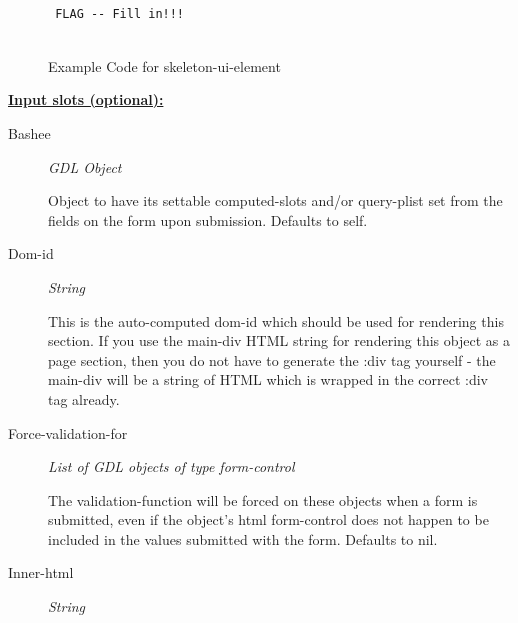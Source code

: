 \documentclass [11pt]{book}
\begin{document}
\begin{itemize}
\begin{figure}
\begin{lrbox}{\boxedverb}
\begin{minipage}{\linewidth}
{\small

\begin{verbatim}

 FLAG -- Fill in!!!


\end{verbatim}}
\end{minipage}
\end{lrbox}
\fbox{\usebox{\boxedverb}}

\caption{Example Code for skeleton-ui-element}

\label{fig:example-code-skeleton-ui-element}

\end{figure}





\textbf{
\underline{Input slots (optional):}}

\begin{description}

\item [Bashee]
\emph{GDL Object}

 Object to have its settable computed-slots and/or query-plist set
from the fields on the form upon submission. Defaults to self.




\item [Dom-id]
\emph{String}

 This is the auto-computed dom-id which should be used for rendering
this section. If you use the main-div HTML string for rendering this object as a
page section, then you do not have to generate the :div tag yourself - the main-div
will be a string of HTML which is wrapped in the correct :div tag already.




\item [Force-validation-for]
\emph{List of GDL objects of type form-control}

 The validation-function will be forced
on these objects when a form is submitted, even if the object's html form-control does
not happen to be included in the values submitted with the form. Defaults to nil.




\item [Inner-html]
\emph{String}


\end{description}
\end{itemize}
\end{document}
